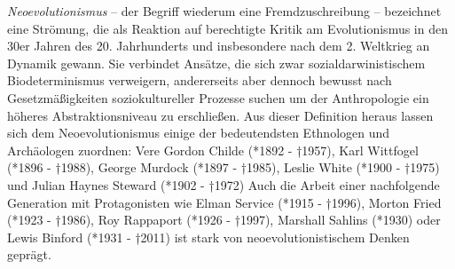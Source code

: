 \documentclass[openany,twoside,twocolumn]{book}
\begin{document}
\emph{Neoevolutionismus} -- der Begriff wiederum eine Fremdzuschreibung
-- bezeichnet eine Strömung, die als Reaktion auf berechtigte Kritik am
Evolutionismus in den 30er Jahren des 20. Jahrhunderts und insbesondere
nach dem 2. Weltkrieg an Dynamik gewann. Sie verbindet Ansätze, die sich
zwar sozialdarwinistischem Biodeterminismus verweigern, andererseits
aber dennoch bewusst nach Gesetzmäßigkeiten soziokultureller Prozesse
suchen um der Anthropologie ein höheres Abstraktionsniveau zu
erschließen. Aus dieser Definition heraus lassen sich dem
Neoevolutionismus einige der bedeutendsten Ethnologen und Archäologen
zuordnen: Vere Gordon Childe (*1892 - †1957), Karl Wittfogel (*1896 -
†1988), George Murdock (*1897 - †1985), Leslie White (*1900 - †1975) und
Julian Haynes Steward (*1902 - †1972) Auch die Arbeit einer nachfolgende
Generation mit Protagonisten wie Elman Service (*1915 - †1996), Morton
Fried (*1923 - †1986), Roy Rappaport (*1926 - †1997), Marshall Sahlins
(*1930) oder Lewis Binford (*1931 - †2011) ist stark von
neoevolutionistischem Denken geprägt.
\end{document}
